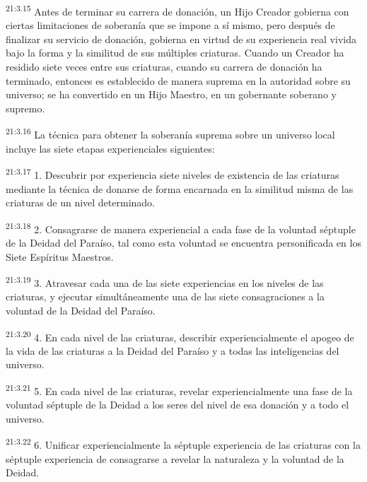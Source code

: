 \par
\textsuperscript{21:3.15} Antes de terminar su carrera de donación, un Hijo Creador gobierna con ciertas limitaciones de soberanía que se impone a sí mismo, pero después de finalizar su servicio de donación, gobierna en virtud de su experiencia real vivida bajo la forma y la similitud de sus múltiples criaturas. Cuando un Creador ha residido siete veces entre sus criaturas, cuando su carrera de donación ha terminado, entonces es establecido de manera suprema en la autoridad sobre su universo; se ha convertido en un Hijo Maestro, en un gobernante soberano y supremo.

\par
\textsuperscript{21:3.16} La técnica para obtener la soberanía suprema sobre un universo local incluye las siete etapas experienciales siguientes:

\par
\textsuperscript{21:3.17} 1. Descubrir por experiencia siete niveles de existencia de las criaturas mediante la técnica de donarse de forma encarnada en la similitud misma de las criaturas de un nivel determinado.

\par
\textsuperscript{21:3.18} 2. Consagrarse de manera experiencial a cada fase de la voluntad séptuple de la Deidad del Paraíso, tal como esta voluntad se encuentra personificada en los Siete Espíritus Maestros.

\par
\textsuperscript{21:3.19} 3. Atravesar cada una de las siete experiencias en los niveles de las criaturas, y ejecutar simultáneamente una de las siete consagraciones a la voluntad de la Deidad del Paraíso.

\par
\textsuperscript{21:3.20} 4. En cada nivel de las criaturas, describir experiencialmente el apogeo de la vida de las criaturas a la Deidad del Paraíso y a todas las inteligencias del universo.

\par
\textsuperscript{21:3.21} 5. En cada nivel de las criaturas, revelar experiencialmente una fase de la voluntad séptuple de la Deidad a los seres del nivel de esa donación y a todo el universo.

\par
\textsuperscript{21:3.22} 6. Unificar experiencialmente la séptuple experiencia de las criaturas con la séptuple experiencia de consagrarse a revelar la naturaleza y la voluntad de la Deidad.

